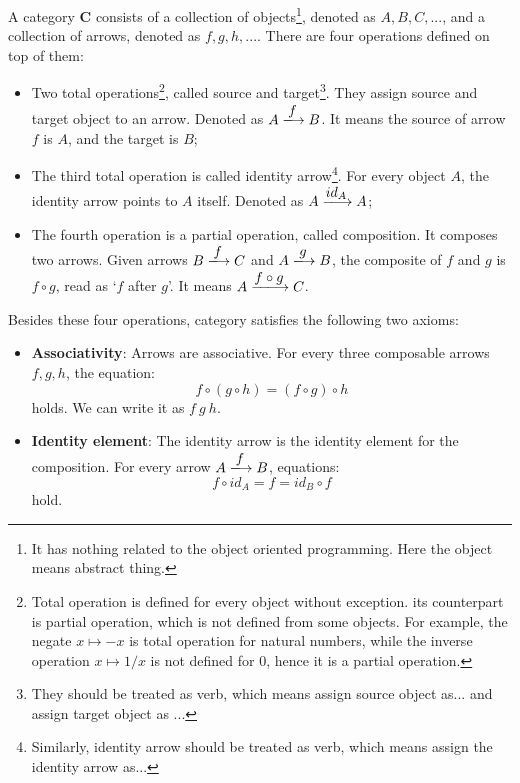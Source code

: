 \documentclass{article}
\begin{document}
 
\begin{definition}
A category $\pmb{C}$ consists of a collection of objects\footnote{It has nothing related to the object oriented programming. Here the object means abstract thing.}, denoted as $A, B, C, ...$, and a collection of arrows, denoted as $f, g, h, ...$. There are four operations defined on top of them:
\begin{itemize}
\item Two total operations\footnote{Total operation is defined for every object without exception. its counterpart is partial operation, which is not defined from some objects. For example, the negate $x \mapsto -x$ is total operation for natural numbers, while the inverse operation $x \mapsto 1/x$ is not defined for 0, hence it is a partial operation.}, called source and target\footnote{They should be treated as verb, which means assign source object as... and assign target object as ...}. They assign source and target object to an arrow. Denoted as $A \arrowto{f} B$. It means the source of arrow $f$ is $A$, and the target is $B$;

\item The third total operation is called identity arrow\footnote{Similarly, identity arrow should be treated as verb, which means assign the identity arrow as...}. For every object $A$, the identity arrow points to $A$ itself. Denoted as $A \arrowto{id_A} A$;

\item The fourth operation is a partial operation, called composition. It composes two arrows. Given arrows $B \arrowto{f} C$ and $A \arrowto{g} B$, the composite of $f$ and $g$ is $f \circ g$, read as `$f$ after $g$'. It means $A \arrowto{f \circ g} C$.

\end{itemize}

Besides these four operations, category satisfies the following two axioms:

\begin{itemize}
\item \textbf{Associativity}: Arrows are associative. For every three composable arrows $f, g, h$, the equation:
\[
f \circ (g \circ h) = (f \circ g) \circ h
\]
holds. We can write it as $f\ g\ h$.
\item \textbf{Identity element}: The identity arrow is the identity element for the composition. For every arrow $A \arrowto{f} B$, equations:
\[
f \circ id_A = f = id_B \circ f
\]
hold.
\end{itemize}
\end{definition}
\end{document}
